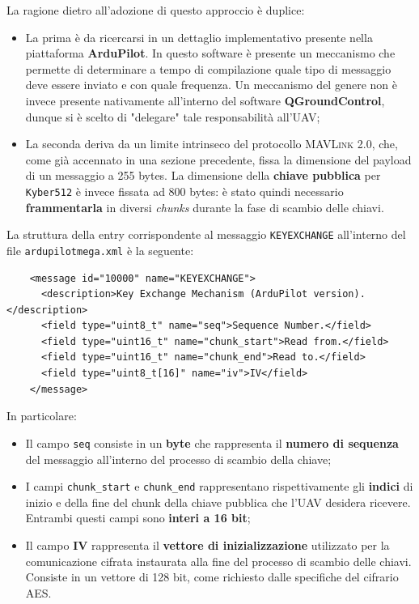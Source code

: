\documentclass[a4paper, 12pt, oneside]{article}
\theoremstyle{definition}
\begin{document}
La ragione dietro all'adozione di questo approccio è duplice: 

\begin{itemize}
    \item La prima è da ricercarsi in un dettaglio implementativo presente nella piattaforma \textbf{ArduPilot}. In questo software è presente un meccanismo che permette di determinare a tempo di compilazione quale tipo di messaggio deve essere inviato e con quale frequenza. Un meccanismo del genere non è invece presente nativamente all'interno del software \textbf{QGroundControl}, dunque si è scelto di "delegare" tale responsabilità all'UAV;
    \item La seconda deriva da un limite intrinseco del protocollo \textsc{MAVLink} 2.0, che, come già accennato in una sezione precedente, fissa la dimensione del payload di un messaggio a 255 bytes. La dimensione della \textbf{chiave pubblica} per \texttt{Kyber512} è invece fissata ad 800 bytes: è stato quindi necessario \textbf{frammentarla} in diversi \textit{chunks} durante la fase di scambio delle chiavi.
\end{itemize}

La struttura della entry corrispondente al messaggio \texttt{KEYEXCHANGE} all'interno del file \texttt{ardupilotmega.xml} è la seguente:

\begin{verbatim}
    <message id="10000" name="KEYEXCHANGE">
      <description>Key Exchange Mechanism (ArduPilot version).</description>
      <field type="uint8_t" name="seq">Sequence Number.</field>
      <field type="uint16_t" name="chunk_start">Read from.</field>
      <field type="uint16_t" name="chunk_end">Read to.</field>
      <field type="uint8_t[16]" name="iv">IV</field>
    </message>
\end{verbatim}

In particolare:

\begin{itemize}
    \item Il campo \texttt{seq} consiste in un \textbf{byte} che rappresenta il \textbf{numero di sequenza} del messaggio all'interno del processo di scambio della chiave;
    \item I campi \texttt{chunk\_start} e \texttt{chunk\_end} rappresentano rispettivamente gli \textbf{indici} di inizio e della fine del chunk della chiave pubblica che l'UAV desidera ricevere. Entrambi questi campi sono \textbf{interi a 16 bit};
    \item Il campo \textbf{IV} rappresenta il \textbf{vettore di inizializzazione} utilizzato per la comunicazione cifrata instaurata alla fine del processo di scambio delle chiavi. Consiste in un vettore di 128 bit, come richiesto dalle specifiche del cifrario AES.
\end{itemize}
\end{document}

